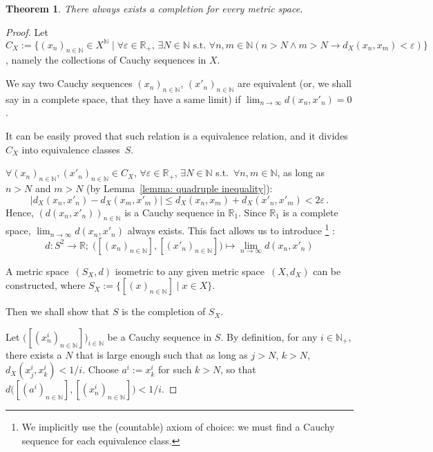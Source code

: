 \documentclass[openany]{book}
\theoremstyle{plain}
\newtheorem{theorem}{Theorem}[section] %
\theoremstyle{definition}
\begin{document}
\begin{theorem}\label{theorem: completion exists}
	There always exists a completion for every metric space.
\end{theorem}
\begin{proof}
	Let $C_X := \{(x_n)_{n \in \mathbb N} \in X^\mathbb N \mid \forall \varepsilon \in \mathbb R_+,\, \exists N \in \mathbb N \text{ s.t. } \forall n, m \in \mathbb N (n > N \wedge m > N \to d_X(x_n, x_m) < \varepsilon)\}$, namely the collections of Cauchy sequences in $X$. 

	We say two Cauchy sequences $(x_n)_{n \in \mathbb N}$, $(x'_n)_{n \in \mathbb N}$ are equivalent (or, we shall say in a complete space, that they have a same limit) if $\lim_{n \to \infty} d(x_n, x'_n) = 0$. 

	It can be easily proved that such relation is a equivalence relation, and it divides $C_X$ into equivalence classes~$S$. 

	$\forall (x_n)_{n \in \mathbb N}, (x'_n)_{n \in \mathbb N} \in C_X$, $\forall \varepsilon \in \mathbb R_+$, $\exists N \in \mathbb N$ s.t.\ $\forall n, m \in \mathbb N$, as long as $n > N$ and $m > N$ (by Lemma~\ref{lemma: quadruple inequality}):
	\begin{equation*}
		|d_X(x_n, x'_n) - d_X(x_m, x'_m)| \leq  d_X(x_n, x_m) + d_X(x'_n, x'_m) 
			< 2 \varepsilon\,.
	\end{equation*}
	Hence, $(d(x_n, x'_n))_{n \in \mathbb N}$ is a Cauchy sequence in $\mathbb R_1$. Since $\mathbb R_1$ is a complete space, $\lim_{n \to \infty} d(x_n, x'_n)$ always exists. This fact allows us to introduce%
		\footnote{We implicitly use the (countable) axiom of choice: we must find a Cauchy sequence for each equivalence class. }%
	:
	\begin{equation*}
		d \colon S^2 \to \mathbb R; \;
			\big([(x_n)_{n \in \mathbb N}], [(x'_n)_{n \in \mathbb N}]\big)
				\mapsto \lim_{n \to \infty} d(x_n, x'_n) 
	\end{equation*}

	A metric space~$(S_X, d)$ isometric to any given metric space~$(X, d_X)$ can be constructed, where $S_X := \{[(x)_{n \in \mathbb N}] \mid x \in X\}$.

	Then we shall show that $S$ is the completion of $S_X$. 

	Let $\big([(x^i_n)_{n \in \mathbb N}]\big)_{i \in \mathbb N}$ be a Cauchy sequence in $S$. 
	By definition, for any $i \in \mathbb N_+$, there exists a $N$ that is large enough such that as long as $j> N$, $k > N$, $d_X(x^i_j, x^i_k) < 1/i$. 
	Choose $a^i := x^i_k$ for such $k > N$, so that $d \big([(a^i)_{n \in \mathbb N}], [(x^i_n)_{n \in \mathbb N}]\big) < 1/i$. 
	

\end{proof}
\end{document}
